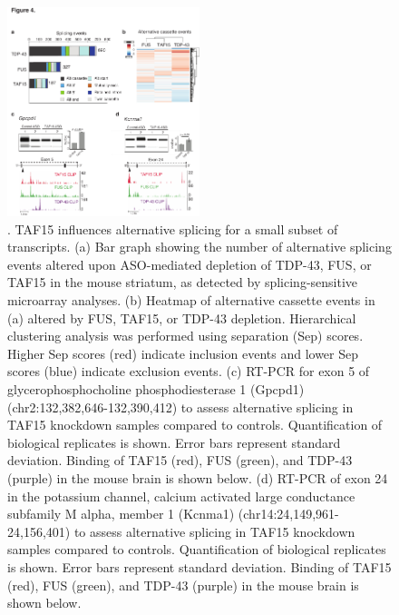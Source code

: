 \begin{figure}[ht]
  \centering
  \includegraphics[width=0.5\textwidth]{chapter_2_figures/Figure_4}
  \caption[Figure 4]{. TAF15 influences alternative splicing for a small subset of transcripts. (a) Bar graph showing the number of alternative splicing events altered upon ASO-mediated depletion of TDP-43, FUS, or TAF15 in the mouse striatum, as detected by splicing-sensitive microarray analyses. (b) Heatmap of alternative cassette events in (a) altered by FUS, TAF15, or TDP-43 depletion. Hierarchical clustering analysis was performed using separation (Sep) scores. Higher Sep scores (red) indicate inclusion events and lower Sep scores (blue) indicate exclusion events. (c) RT-PCR for exon 5 of glycerophosphocholine phosphodiesterase 1 (Gpcpd1) (chr2:132,382,646-132,390,412) to assess alternative splicing in TAF15 knockdown samples compared to controls. Quantification of biological replicates is shown. Error bars represent standard deviation. Binding of TAF15 (red), FUS (green), and TDP-43 (purple) in the mouse brain is shown below. (d) RT-PCR of exon 24 in the potassium channel, calcium activated large conductance subfamily M alpha, member 1 (Kcnma1) (chr14:24,149,961-24,156,401) to assess alternative splicing in TAF15 knockdown samples compared to controls. Quantification of biological replicates is shown. Error bars represent standard deviation. Binding of TAF15 (red), FUS (green), and TDP-43 (purple) in the mouse brain is shown below.}
  \label{fig:Figure_4}
\end{figure}


